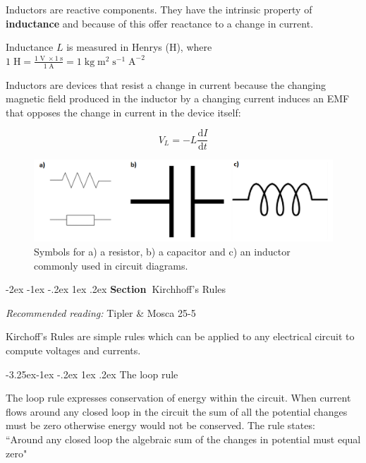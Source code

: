 \documentclass[
]{book}
\makeatletter
\renewcommand\section{%
\@startsection{section}{1}{\z@}%
              {-2ex \@plus -1ex \@minus -.2ex}%
              {1ex \@plus .2ex}%
              {\sffamily\bfseries\large\noindent Section~}}
\renewcommand\subsection{%
\@startsection{subsection}{2}{\z@}%
              {-3.25ex\@plus -1ex \@minus -.2ex}%
              {1ex \@plus .2ex}%
              {\sffamily\bfseries}}
\numberwithin{equation}{section}
\makeatother
\begin{document}
Inductors are reactive components. They have the intrinsic property of
\textbf{inductance} and because of this offer reactance to a change in
current.

Inductance \(L\) is measured in Henrys (H), where\\
\(1 \; \text{H} = \frac{1 \; \text{V} \; \times 1 \; \text{s} } { 1 \; \text{A} } = 1 \; \text{kg} \; \text{m}^{2} \; \text{s}^{-1} \; \text{A}^{-2}\)

Inductors are devices that resist a change in current because the
changing magnetic field produced in the inductor by a changing current
induces an EMF that opposes the change in current in the device itself:

\begin{equation}
\label{eq:Vinductor}
V_L  = -L \frac{\mathrm{d} I}{\mathrm{d} t}
\end{equation}

\begin{figure}

{\centering \includegraphics[width=0.7\linewidth]{Figures/LCR_symbols} 

}

\caption{Symbols for a) a resistor, b) a capacitor and c) an inductor commonly used in circuit diagrams.}\label{fig:LCRsymbols}
\end{figure}

\hypertarget{kirchhoffs-rules}{%
\section{Kirchhoff's Rules}\label{kirchhoffs-rules}}

\emph{Recommended reading:} Tipler \& Mosca 25-5

Kirchoff's Rules are simple rules which can be applied to any electrical
circuit to compute voltages and currents.

\hypertarget{the-loop-rule}{%
\subsection{The loop rule}\label{the-loop-rule}}

The loop rule expresses conservation of energy within the circuit. When
current flows around any closed loop in the circuit the sum of all the
potential changes must be zero otherwise energy would not be conserved.
The rule states:\\
``Around any closed loop the algebraic sum of the changes in potential
must equal zero"
\end{document}
